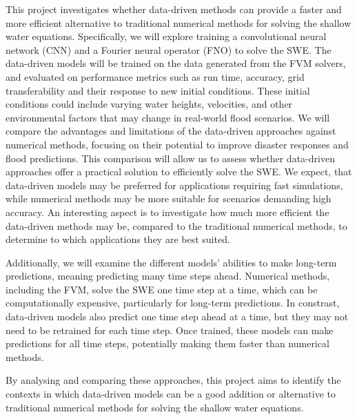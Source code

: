 This project investigates whether data-driven methods can provide a faster and more efficient alternative to traditional numerical methods for solving the shallow water equations.
Specifically, we will explore training a convolutional neural network (CNN) and a Fourier neural operator (FNO) to solve the SWE.
The data-driven models will be trained on the data generated from the FVM solvers, and evaluated on performance metrics such as run time, accuracy, grid transferability and their response to new initial conditions.
These initial conditions could include varying water heights, velocities, and other environmental factors that may change in real-world flood scenarios.
We will compare the advantages and limitations of the data-driven approaches against numerical methods, focusing on their potential to improve disaster responses and flood predictions.
This comparison will allow us to assess whether data-driven approaches offer a practical solution to efficiently solve the SWE.
We expect, that data-driven models may be preferred for applications requiring fast simulations, while numerical methods may be more suitable for scenarios demanding high accuracy.
An interesting aspect is to investigate how much more efficient the data-driven methods may be, compared to the traditional numerical methods, to determine to which applications they are best suited.

Additionally, we will examine the different models' abilities to make long-term predictions, meaning predicting many time steps ahead.
Numerical methods, including the FVM, solve the SWE one time step at a time, which can be computationally expensive, particularly for long-term predictions.
In constrast, data-driven models also predict one time step ahead at a time, but they may not need to be retrained for each time step.
Once trained, these models can make predictions for all time steps, potentially making them faster than numerical methods.

By analysing and comparing these approaches, this project aims to identify the contexts in which data-driven models can be a good addition or alternative to traditional numerical methods for solving the shallow water equations.


